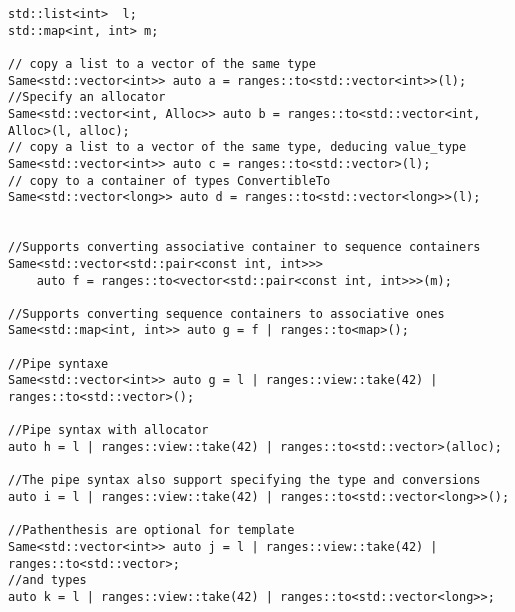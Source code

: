 \documentclass{wg21}
\begin{document}
\begin{verbatim}
std::list<int>  l;
std::map<int, int> m;

// copy a list to a vector of the same type
Same<std::vector<int>> auto a = ranges::to<std::vector<int>>(l);
//Specify an allocator
Same<std::vector<int, Alloc>> auto b = ranges::to<std::vector<int, Alloc>(l, alloc);
// copy a list to a vector of the same type, deducing value_type
Same<std::vector<int>> auto c = ranges::to<std::vector>(l);
// copy to a container of types ConvertibleTo
Same<std::vector<long>> auto d = ranges::to<std::vector<long>>(l);


//Supports converting associative container to sequence containers
Same<std::vector<std::pair<const int, int>>>
	auto f = ranges::to<vector<std::pair<const int, int>>>(m);

//Supports converting sequence containers to associative ones
Same<std::map<int, int>> auto g = f | ranges::to<map>();

//Pipe syntaxe
Same<std::vector<int>> auto g = l | ranges::view::take(42) | ranges::to<std::vector>();

//Pipe syntax with allocator
auto h = l | ranges::view::take(42) | ranges::to<std::vector>(alloc);

//The pipe syntax also support specifying the type and conversions
auto i = l | ranges::view::take(42) | ranges::to<std::vector<long>>();

//Pathenthesis are optional for template
Same<std::vector<int>> auto j = l | ranges::view::take(42) | ranges::to<std::vector>;
//and types
auto k = l | ranges::view::take(42) | ranges::to<std::vector<long>>;

\end{verbatim}

\pagebreak
\end{document}
